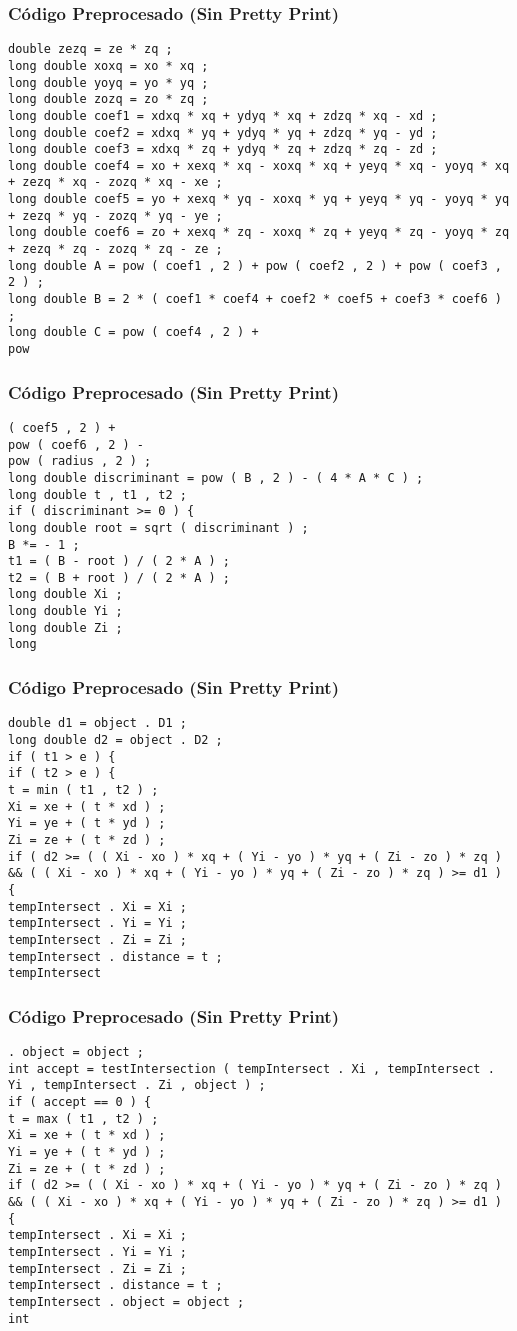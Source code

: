 \documentclass{beamer}
\begin{document}
\begin{frame}[fragile]
\frametitle{C\'odigo Preprocesado (Sin Pretty Print)}
\begin{lstlisting}[style=CStyle]
double zezq = ze * zq ; 
long double xoxq = xo * xq ; 
long double yoyq = yo * yq ; 
long double zozq = zo * zq ; 
long double coef1 = xdxq * xq + ydyq * xq + zdzq * xq - xd ; 
long double coef2 = xdxq * yq + ydyq * yq + zdzq * yq - yd ; 
long double coef3 = xdxq * zq + ydyq * zq + zdzq * zq - zd ; 
long double coef4 = xo + xexq * xq - xoxq * xq + yeyq * xq - yoyq * xq + zezq * xq - zozq * xq - xe ; 
long double coef5 = yo + xexq * yq - xoxq * yq + yeyq * yq - yoyq * yq + zezq * yq - zozq * yq - ye ; 
long double coef6 = zo + xexq * zq - xoxq * zq + yeyq * zq - yoyq * zq + zezq * zq - zozq * zq - ze ; 
long double A = pow ( coef1 , 2 ) + pow ( coef2 , 2 ) + pow ( coef3 , 2 ) ; 
long double B = 2 * ( coef1 * coef4 + coef2 * coef5 + coef3 * coef6 ) ; 
long double C = pow ( coef4 , 2 ) + 
pow \end{lstlisting}
\end{frame}
\begin{frame}[fragile]
\frametitle{C\'odigo Preprocesado (Sin Pretty Print)}
\begin{lstlisting}[style=CStyle]
( coef5 , 2 ) + 
pow ( coef6 , 2 ) - 
pow ( radius , 2 ) ; 
long double discriminant = pow ( B , 2 ) - ( 4 * A * C ) ; 
long double t , t1 , t2 ; 
if ( discriminant >= 0 ) { 
long double root = sqrt ( discriminant ) ; 
B *= - 1 ; 
t1 = ( B - root ) / ( 2 * A ) ; 
t2 = ( B + root ) / ( 2 * A ) ; 
long double Xi ; 
long double Yi ; 
long double Zi ; 
long \end{lstlisting}
\end{frame}
\begin{frame}[fragile]
\frametitle{C\'odigo Preprocesado (Sin Pretty Print)}
\begin{lstlisting}[style=CStyle]
double d1 = object . D1 ; 
long double d2 = object . D2 ; 
if ( t1 > e ) { 
if ( t2 > e ) { 
t = min ( t1 , t2 ) ; 
Xi = xe + ( t * xd ) ; 
Yi = ye + ( t * yd ) ; 
Zi = ze + ( t * zd ) ; 
if ( d2 >= ( ( Xi - xo ) * xq + ( Yi - yo ) * yq + ( Zi - zo ) * zq ) && ( ( Xi - xo ) * xq + ( Yi - yo ) * yq + ( Zi - zo ) * zq ) >= d1 ) { 
tempIntersect . Xi = Xi ; 
tempIntersect . Yi = Yi ; 
tempIntersect . Zi = Zi ; 
tempIntersect . distance = t ; 
tempIntersect \end{lstlisting}
\end{frame}
\begin{frame}[fragile]
\frametitle{C\'odigo Preprocesado (Sin Pretty Print)}
\begin{lstlisting}[style=CStyle]
. object = object ; 
int accept = testIntersection ( tempIntersect . Xi , tempIntersect . Yi , tempIntersect . Zi , object ) ; 
if ( accept == 0 ) { 
t = max ( t1 , t2 ) ; 
Xi = xe + ( t * xd ) ; 
Yi = ye + ( t * yd ) ; 
Zi = ze + ( t * zd ) ; 
if ( d2 >= ( ( Xi - xo ) * xq + ( Yi - yo ) * yq + ( Zi - zo ) * zq ) && ( ( Xi - xo ) * xq + ( Yi - yo ) * yq + ( Zi - zo ) * zq ) >= d1 ) { 
tempIntersect . Xi = Xi ; 
tempIntersect . Yi = Yi ; 
tempIntersect . Zi = Zi ; 
tempIntersect . distance = t ; 
tempIntersect . object = object ; 
int \end{lstlisting}
\end{frame}
\end{document}
